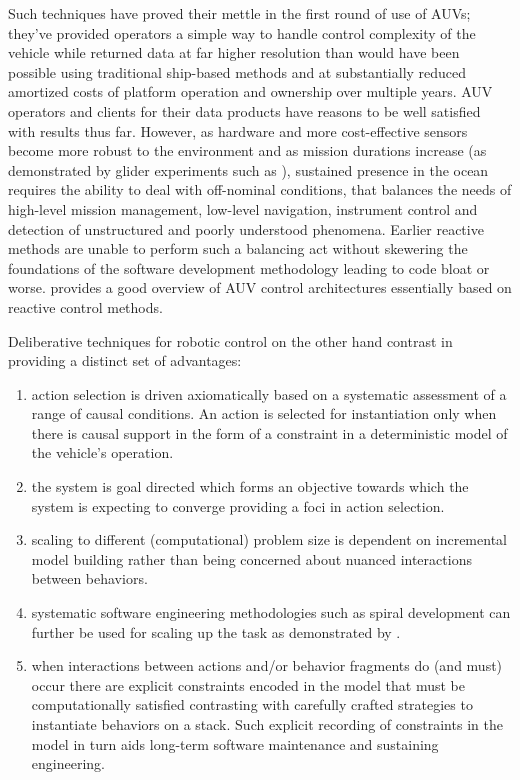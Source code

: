 Such techniques have proved their mettle in the first round of use of
AUVs; they've provided operators a simple way to handle control
complexity of the vehicle while returned data at far higher resolution
than would have been possible using traditional ship-based methods and
at substantially reduced amortized costs of platform operation and
ownership over multiple years. AUV operators and clients for their
data products have reasons to be well satisfied with results thus
far. However, as hardware and more cost-effective sensors become more
robust to the environment and as mission durations increase (as
demonstrated by glider experiments such as \cite{rucool11}), sustained
presence in the ocean requires the ability to deal with off-nominal
conditions, that balances the needs of high-level mission management,
low-level navigation, instrument control and detection of unstructured
and poorly understood phenomena. Earlier reactive methods are unable
to perform such a balancing act without skewering the foundations of
the software development methodology leading to code bloat or worse.
\cite{carreras06} provides a good overview of AUV control
architectures essentially based on reactive control methods.

Deliberative techniques for robotic control on the other hand
contrast in providing a distinct set of advantages:

\begin{enumerate}

\item action selection is driven axiomatically based on a systematic
  assessment of a range of causal conditions. An action is selected
  for instantiation only when there is causal support in the form of a
  constraint in a deterministic model of the vehicle's operation.

\item the system is goal directed which forms an objective towards
  which the system is expecting to converge providing a foci in action
  selection.

\item scaling to different (computational) problem size is dependent
  on incremental model building rather than being concerned about
  nuanced interactions between behaviors.

\item systematic software engineering methodologies such as spiral
  development \cite{boehm86} can further be used for scaling up the
  task as demonstrated by \cite{DS1report}.

\item when interactions between actions and/or behavior fragments do
  (and must) occur there are explicit constraints encoded in the model
  that must be computationally satisfied contrasting with carefully
  crafted strategies to instantiate behaviors on a stack. Such
  explicit recording of constraints in the model in turn aids
  long-term software maintenance and sustaining engineering.

\end{enumerate}

